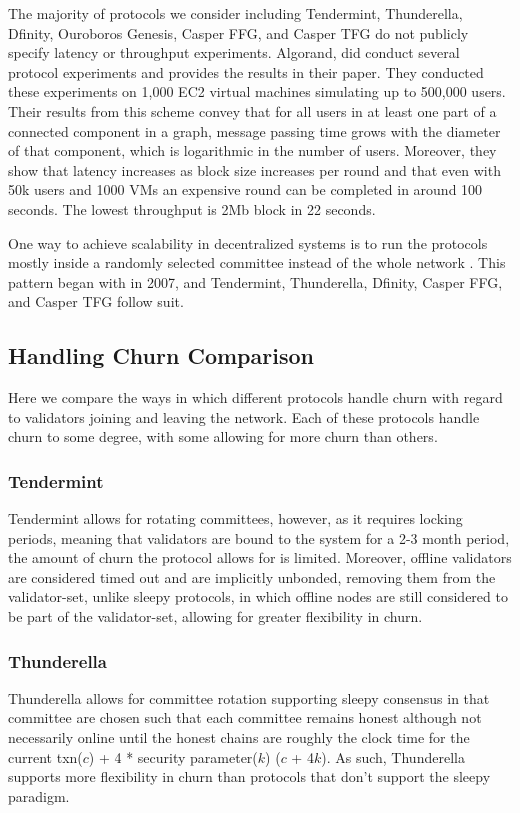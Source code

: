 \documentclass[10pt,journal,compsoc]{IEEEtran}
\begin{document}
The majority of protocols we consider including Tendermint, Thunderella, Dfinity, Ouroboros Genesis, Casper FFG, and Casper TFG do not publicly specify latency or throughput experiments. Algorand, did conduct several protocol experiments and provides the results in their paper. They conducted these experiments on 1,000 EC2 virtual machines simulating up to 500,000 users. Their results from this scheme convey that for all users in at least one part of a connected component in a graph, message passing time grows with the diameter of that component, which is logarithmic in the number of users. Moreover, they show that latency increases as block size increases per round and that even with 50k users and 1000 VMs an expensive round can be completed in around 100 seconds. The lowest throughput is 2Mb block in 22 seconds.  
 
One way to achieve scalability in decentralized systems is to run the protocols mostly inside a randomly selected committee instead of the whole network \cite{KapronEtAl}. This pattern began with \cite{KingEtAl} in 2007, and Tendermint, Thunderella, Dfinity, Casper FFG, and Casper TFG follow suit.

\subsection{Handling Churn Comparison}
Here we compare the ways in which different protocols handle churn with regard to validators joining and leaving the network. Each of these protocols handle churn to some degree, with some allowing for more churn than others. 

\subsubsection{Tendermint} Tendermint allows for rotating committees, however, as it requires locking periods, meaning that validators are bound to the system for a 2-3 month period, the amount of churn the protocol allows for is limited. Moreover, offline validators are considered timed out and are implicitly unbonded, removing them from the validator-set, unlike sleepy protocols, in which offline nodes are still considered to be part of the validator-set, allowing for greater flexibility in churn. \cite{Sleepy}

\subsubsection{Thunderella} Thunderella allows for committee rotation supporting sleepy consensus in that committee are chosen such that each committee remains honest although not necessarily online until the honest chains are roughly the clock time for the current txn($c$) + 4 * security parameter($k$) ($c$ + 4$k$). As such, Thunderella supports more flexibility in churn than protocols that don't support the sleepy paradigm. 
  
\end{document}
